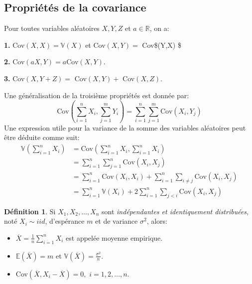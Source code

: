 \documentclass[
]{book}
\providecommand{\tightlist}{%
  \setlength{\itemsep}{0pt}\setlength{\parskip}{0pt}}
\theoremstyle{definition}
\newtheorem{definition}{Définition}[chapter]
\theoremstyle{definition}
\theoremstyle{definition}
\theoremstyle{remark}
\begin{document}
\hypertarget{propriuxe9tuxe9s-de-la-covariance}{%
\subsection*{Propriétés de la covariance}\label{propriuxe9tuxe9s-de-la-covariance}}

Pour toutes variables aléatoires \(X, Y, Z\) et \(a \in \mathbb{R}\), on a:

\textbf{1.} Cov\((X,X)=\mathbb{V}(X)\) et Cov\((X,Y)=\) Cov\$(Y,X) \$

\textbf{2.} Cov\((aX,Y)=a\)Cov\((X,Y)\).

\textbf{3.} Cov\((X,Y+Z)=\) Cov\((X,Y)+\) Cov\((X,Z)\).

Une généralisation de la troisième propriétés est donnée par:
\[
\text{Cov}\left( \sum_{i=1}^nX_i,\sum_{j=1}^m Y_i \right)=\sum_{i=1}^n \sum_{j=1}^m \text{Cov}(X_i,Y_j)
\]
Une expression utile pour la variance de la somme des variables aléatoires peut être déduite comme suit:
\begin{align*}
\mathbb{V}\left(\sum_{i=1}^nX_i \right)& =\text{Cov}\left(\sum_{i=1}^nX_i,\sum_{i=1}^nX_i\right)\\
&=\sum_{i=1}^n \sum_{j=1}^n\text{Cov}(X_i,X_j)\\
&=\sum_{i=1}^n\text{Cov}(X_i,X_i)+\sum_{i=1}^n\sum_{i\neq j}\text{Cov}(X_i,X_j)\\
&=\sum_{i=1}^n\mathbb{V}(X_i)+2\sum_{i=1}^n\sum_{j <i} \text{Cov}(X_i,X_j)
\end{align*}

\begin{definition}
\protect\hypertarget{def:unnamed-chunk-11}{}{\label{def:unnamed-chunk-11} }Si \(X_1,X_2,\ldots, X_n\) sont \emph{indépendantes et identiquement distribuées}, noté \(X_i \sim iid\), d'espérance \(m\) et de variance \(\sigma^2\), alors:

\begin{itemize}
\tightlist
\item
  \(\overline{X}=\displaystyle \frac{1}{n}\sum_{i=1}^n X_i\) est appelée moyenne empirique.
\item
  \(\mathbb{E}(\overline{X})=m\) et \(\mathbb{V}(\overline{X})=\displaystyle \frac{\sigma^2}{n}\).
\item
  Cov\((\overline{X},X_i-\overline{X})=0,\) \(i=1,2,\ldots,n\).
\end{itemize}
\end{definition}
\end{document}
